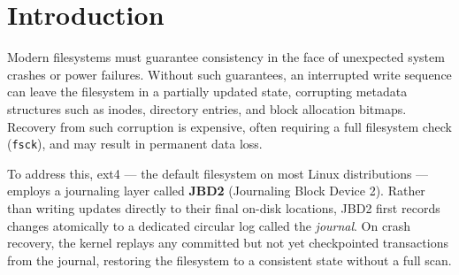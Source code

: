 \documentclass[12pt,a4paper]{article}
\begin{document}
\begin{abstract}
This report describes the work of the \textbf{MTech Rocks} group on
the ext4/JBD2 consistency mechanism on Linux~6.1.4. We benchmarked
the baseline cost of each ext4 journaling mode and identified where
the journal hurts performance most; this characterization provided
clear directions for further optimization. We then addressed two
fast-commit fallback paths with small kernel patches:
\texttt{EXT4\_FC\_REASON\_XATTR} (108 lines, 64$\times$ fewer JBD2
full commits on a setxattr workload, 27\% wall-time gain on VM and
48\% on bare-metal) and
\texttt{EXT4\_FC\_REASON\_FALLOC\_RANGE} (46 lines, 62.5$\times$
fewer commits on collapse/insert range, 23--26\% improvement on VM
and 42--44\% on bare-metal).

We further developed a kernel module using \texttt{kretprobes} to
measure that $\sim$78\% of fsync time is spent inside
\texttt{jbd2\_log\_wait\_commit}, and replaced this function with a
lockless CAS-based version, achieving improvements of +40\%, +54\%,
and +7\% IOPS at 16 threads across three workloads, without
regression in streaming performance.

Finally, we designed a kernel module that replaces JBD2's strict
ring-buffer journal allocator with a free-block bitmap, reducing
P99 latency on a WAL workload from 0.41~ms to 0.05~ms in
\texttt{ordered} mode while maintaining the same write
amplification factor.
\end{abstract}

\newpage
\tableofcontents
\newpage

\section{Introduction}

Modern filesystems must guarantee consistency in the face of unexpected system crashes
or power failures. Without such guarantees, an interrupted write sequence can leave the
filesystem in a partially updated state, corrupting metadata structures such as inodes,
directory entries, and block allocation bitmaps. Recovery from such corruption is
expensive, often requiring a full filesystem check (\texttt{fsck}), and may result in
permanent data loss.

To address this, ext4 --- the default filesystem on most Linux distributions --- employs
a journaling layer called \textbf{JBD2} (Journaling Block Device 2). Rather than writing
updates directly to their final on-disk locations, JBD2 first records changes atomically
to a dedicated circular log called the \textit{journal}. On crash recovery, the kernel
replays any committed but not yet checkpointed transactions from the journal, restoring
the filesystem to a consistent state without a full scan. 
\end{document}
